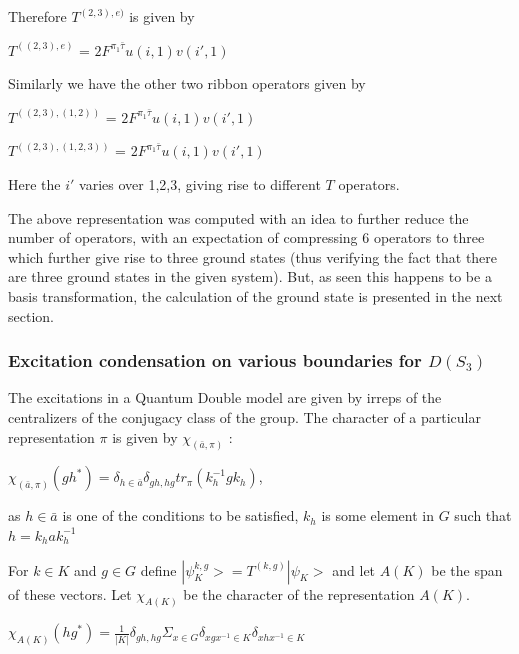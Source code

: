 Therefore $T^{(2,3),e)}$ is given by 
\begin{center}
$T^{((2,3),e)}$ = $2F^{\pi_{1}\bar{\tau}}u(i,1)v(i',1)$ %
\end{center}

Similarly we have the other two ribbon operators given by 

\begin{center}
$T^{((2,3),(1,2))}$ = $2F^{\pi_{1}\bar{\tau}}u(i,1)v(i',1)$ %
\end{center}

\begin{center}
$T^{((2,3),(1,2,3))}$ = $2F^{\pi_{1}\bar{\tau}}u(i,1)v(i',1)$ %
\end{center}

Here the $i'$ varies over 1,2,3, giving rise to different $T$ operators. 

The above representation was computed with an idea to further reduce the number of operators, with an expectation of compressing 6 operators 
to three which further give rise to three ground states (thus verifying the fact that there are three ground states in the given system). 
But, as seen this happens to be a basis transformation, the calculation of the ground state is presented in the next section.

\subsubsection{Excitation condensation on various boundaries for $D(S_{3})$}
           The excitations in a Quantum Double model are given by irreps of the centralizers of the conjugacy class of the group. The character of a particular
representation $\pi$ is given by  $\chi_{(\bar{a}, \pi)}$ : 
\begin{center}
$\chi_{(\bar{a}, \pi)}(gh^{*}) = \delta_{h\in\bar{a}}\delta_{gh, hg} tr_{\pi}(k_{h}^{-1}gk_{h})$, 
\end{center}
as $h\in\bar{a}$ is one of the conditions to be satisfied, $k_{h}$ is some element in $G$ such that $h = k_{h}ak_{h}^{-1}$

For $k \in K$ and $g \in G$ define $|\psi^{k,g}_{K}> = T^{(k,g)} |\psi_{K}>$ and let $A(K)$ be the span of these vectors. Let $\chi_{A(K)}$ be the 
character of the representation $A(K)$. 
\begin{center}
$\chi_{A(K)}(hg^{*}) = \frac{1}{|K|}\delta_{gh,hg}\varSigma_{x \in G}\delta_{xgx^{-1} \in K}\delta_{xhx^{-1} \in K}$
\end{center}

